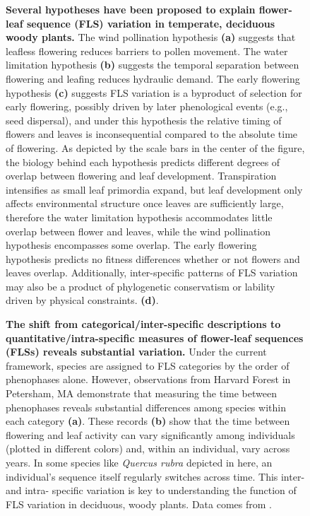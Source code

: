 \documentclass[11pt]{article}
\begin{document}
\begin{figure}[h!]
    \centering
    \caption{\textbf{Several hypotheses have been proposed to explain flower-leaf sequence (FLS) variation in temperate, deciduous woody plants.}  The wind pollination hypothesis \textbf{(a)} suggests that leafless flowering reduces barriers to pollen movement. The water limitation hypothesis \textbf{(b)} suggests the temporal separation between flowering and leafing reduces hydraulic demand. The early flowering hypothesis \textbf{(c)} suggests FLS variation is a byproduct of selection for early flowering, possibly driven by later phenological events (e.g., seed dispersal), and under this hypothesis the relative timing of flowers and leaves is inconsequential compared to the absolute time of flowering. As depicted by the scale bars in the center of the figure, the biology behind each hypothesis predicts different degrees of overlap between flowering and leaf development. Transpiration intensifies as small leaf primordia expand, but leaf development only affects environmental structure once leaves are sufficiently large, therefore the water limitation hypothesis accommodates little overlap between flower and leaves, while the wind pollination hypothesis encompasses some overlap. The early flowering hypothesis predicts no fitness differences whether or not flowers and leaves overlap. Additionally, inter-specific patterns of FLS variation may also be a product of phylogenetic conservatism or lability driven by physical constraints. \textbf{(d)}.}
    \label{fig:conceptual}
\end{figure}
 \begin{figure}[h!]
        \centering
          \caption{\textbf{The shift from categorical/inter-specific descriptions to quantitative/intra-specific measures of flower-leaf sequences (FLSs) reveals substantial variation.} Under the current framework, species are assigned to FLS categories by the order of phenophases alone. However, observations from Harvard Forest in Petersham, MA demonstrate that measuring the time between phenophases reveals substantial differences among species within each category \textbf{(a)}. These records \textbf{(b)} show that the time between flowering and leaf activity can vary significantly among individuals (plotted in different colors) and, within an individual, vary across years. In some species like \emph{Quercus rubra} depicted in here, an individual's sequence itself regularly switches across time. This inter- and intra- specific variation is key to understanding the function of FLS variation in deciduous, woody plants. Data comes from \citet{OKeefe2015}.}
        \label{fig:vizzy}
    \end{figure}
\end{document}
